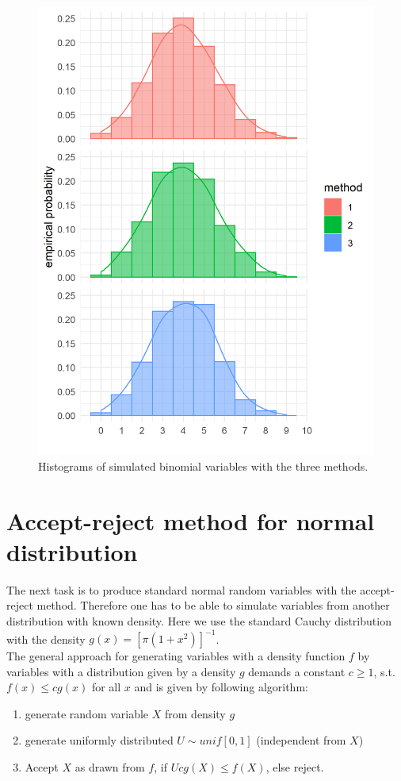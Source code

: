 \begin{figure}[thbp]
\centering
\includegraphics[scale = 0.8, keepaspectratio]{ex2/emp_all_col.png}
\caption{Histograms of simulated binomial variables with the three methods.}
\label{fig:emp_all_col}
\end{figure}

\newpage
\section{Accept-reject method for normal distribution}

The next task is to produce standard normal random variables with the accept-reject method. Therefore one has to be able to simulate variables from another distribution with known density. Here we use the standard Cauchy distribution with the density $g(x)=[\pi (1+x^2)]^{-1}$.\\

The general approach for generating variables with a density function $f$ by variables with a distribution given by a density $g$ demands a constant $c\geq 1$, s.t. $f(x)\leq cg(x)$ for all $x$ and is given by following algorithm:
\begin{enumerate}
\item generate random variable $X$ from density $g$
\item generate uniformly distributed $U\sim unif[0,1]$ (independent from $X$)
\item Accept $X$ as drawn from $f$, if $Ucg(X)\leq f(X)$, else reject.
\end{enumerate} 

